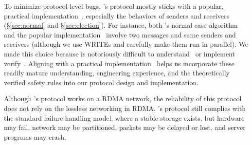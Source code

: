 % 
To minimize protocol-level bugs, 
\xxx's \paxos protocol mostly sticks with a popular, 
practical implementation~\cite{paxos:practical}, especially the behaviors of 
senders and receivers (\S\ref{sec:normal} and \S\ref{sec:election}). For 
instance, both \xxx's normal case algorithm and 
the popular implementation~\cite{paxos:practical} involve two messages and 
same senders and receivers (although we use WRITEs and carefully make them run 
in parallel). We made this choice 
because \paxos is notoriously difficult to 
understand~\cite{raft:usenix14,paxos:simple,paxos,paxos:complex} or 
implement~\cite{paxos:live,paxos:practical} 
verify~\cite{modist:nsdi09,demeter:sosp11}. Aligning with a practical
\paxos implementation~\cite{paxos:practical} helps us incorporate these 
readily mature understanding, engineering experience, and the theoretically 
verified safety rules into our protocol design and implementation.

Although \xxx's \paxos protocol works on a RDMA network, the reliability of 
this protocol does not rely on the lossless networking in RDMA. \xxx's protocol 
still complies with the standard \paxos failure-handling model, where a stable 
storage exists, but hardware may fail, network may be partitioned, packets may 
be delayed or lost, and server programs may crash.



